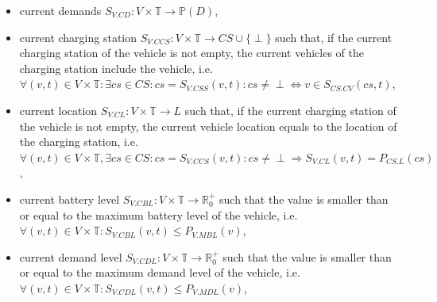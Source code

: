 \documentclass[graybox]{svmult}
\begin{document}
\begin{itemize}
	\item current demands $S_{V.CD}: V \times \mathbb{T} \rightarrow \mathbb{P}(D)$,
	\item current charging station $S_{V.CCS}: V \times \mathbb{T} \rightarrow CS \cup \{\perp\}$ such that, if the current charging station of the vehicle is not empty, the current vehicles of the charging station include the vehicle, i.e.\ $\forall (v,t) \in V \times \mathbb{T}: \exists cs \in CS: cs = S_{V.CSS}(v,t): cs \neq \perp \Leftrightarrow v \in S_{CS.CV}(cs,t)$,
	\item current location $S_{V.CL}: V \times \mathbb{T} \rightarrow L$ such that, if the current charging station of the vehicle is not empty, the current vehicle location equals to the location of the charging station, i.e.\ $\forall (v,t) \in V \times \mathbb{T}, \exists cs \in CS: cs = S_{V.CCS}(v,t): cs \neq \perp \Rightarrow S_{V.CL}(v,t)=P_{CS.L}(cs)$,
	\item current battery level $S_{V.CBL}: V \times \mathbb{T} \rightarrow \mathbb{R}_0^+$ such that the value is smaller than or equal to the maximum battery level of the vehicle, i.e.\ $\forall (v,t) \in V \times \mathbb{T}: S_{V.CBL}(v,t) \leq P_{V.MBL}(v)$,
	\item current demand level $S_{V.CDL}: V \times \mathbb{T} \rightarrow \mathbb{R}_0^+$ such that the value is smaller than or equal to the maximum demand level of the vehicle, i.e.\ $\forall (v,t) \in V \times \mathbb{T}: S_{V.CDL}(v,t) \leq P_{V.MDL}(v)$,
	
	
	
\end{itemize}
\noindent
\end{document}
